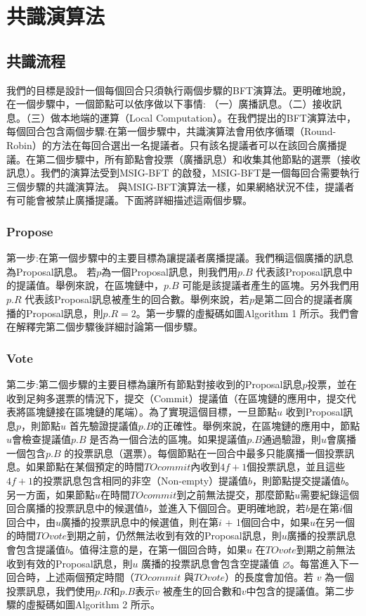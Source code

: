 \chapter{共識演算法}\label{se_3}

\section{共識流程}\label{se_3} 
我們的目標是設計一個每個回合只須執行兩個步驟的BFT演算法。更明確地說，在一個步驟中，一個節點可以依序做以下事情: （一）廣播訊息。（二）接收訊息。（三）做本地端的運算（Local Computation）。在我們提出的BFT演算法中，每個回合包含兩個步驟:在第一個步驟中，共識演算法會用依序循環（Round-Robin）的方法在每回合選出一名提議者。只有該名提議者可以在該回合廣播提議。在第二個步驟中，所有節點會投票（廣播訊息）和收集其他節點的選票（接收訊息）。我們的演算法受到MSIG-BFT \cite{chen2018msig}的啟發，MSIG-BFT是一個每回合需要執行三個步驟的共識演算法。 與MSIG-BFT演算法一樣，如果網絡狀況不佳，提議者有可能會被禁止廣播提議。下面將詳細描述這兩個步驟。
%
\subsection{Propose}\label{se_3} 
第一步:在第一個步驟中的主要目標為讓提議者廣播提議。我們稱這個廣播的訊息為Proposal訊息。 若$p$為一個Proposal訊息，則我們用$p.B$ 代表該Proposal訊息中的提議值。舉例來說，在區塊鏈中，$p.B$ 可能是該提議者產生的區塊。另外我們用$p.R$ 代表該Proposal訊息被產生的回合數。舉例來說，若$p$是第二回合的提議者廣播的Proposal訊息，則$p.R = 2$。第一步驟的虛擬碼如圖Algorithm 1 所示。我們會在解釋完第二個步驟後詳細討論第一個步驟。


\subsection{Vote}\label{se_3} 
第二步:第二個步驟的主要目標為讓所有節點對接收到的Proposal訊息$p$投票，並在收到足夠多選票的情況下，提交（Commit）提議值（在區塊鏈的應用中，提交代表將區塊鏈接在區塊鏈的尾端）。為了實現這個目標，一旦節點$u$ 收到Proposal訊息$p$，則節點$u$ 首先驗證提議值$p.B$的正確性。舉例來說，在區塊鏈的應用中，節點$u$會檢查提議值$p.B$ 是否為一個合法的區塊。如果提議值$p.B$通過驗證，則$u$會廣播一個包含$p.B$ 的投票訊息（選票）。每個節點在一回合中最多只能廣播一個投票訊息。如果節點在某個預定的時間$TOcommit$內收到$4f+ 1$個投票訊息，並且這些$4f+1$的投票訊息包含相同的非空（Non-empty）提議值$b$，則節點提交提議值$b$。另一方面，如果節點$u$在時間$TOcommit$到之前無法提交，那麼節點$u$需要紀錄這個回合廣播的投票訊息中的候選值$b$，並進入下個回合。更明確地說，若$b$是在第$i$個回合中，由$u$廣播的投票訊息中的候選值，則在第$i$ + 1個回合中，如果$u$在另一個的時間$TOvote$到期之前，仍然無法收到有效的Proposal訊息，則$u$廣播的投票訊息會包含提議值$b$。值得注意的是，在第一個回合時，如果$u$ 在$TOvote$到期之前無法收到有效的Proposal訊息，則$u$ 廣播的投票訊息會包含空提議值 $\varnothing$。每當進入下一回合時，上述兩個預定時間（$TOcommit$ 與$TOvote$）的長度會加倍。若 $v$ 為一個投票訊息，我們使用$p.R$和$p.B$表示$v$ 被產生的回合數和$v$中包含的提議值。第二步驟的虛擬碼如圖Algorithm 2 所示。


